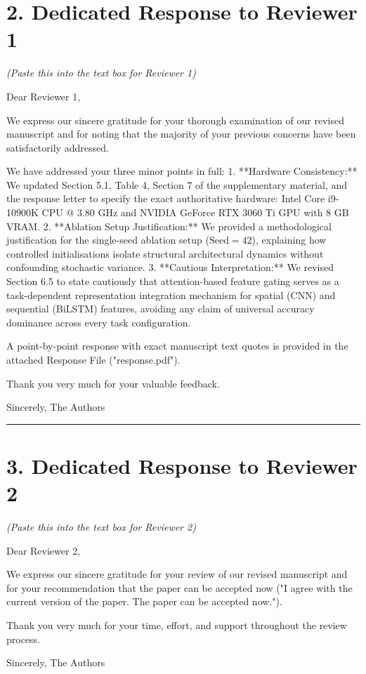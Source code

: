 \documentclass[11pt]{article}
\begin{document}
\section*{2. Dedicated Response to Reviewer 1}
\textit{(Paste this into the text box for Reviewer 1)}

\begin{tcolorbox}[colback=boxbg,colframe=primaryblue,title=\textbf{Text for Reviewer 1 Box}]
Dear Reviewer 1,

We express our sincere gratitude for your thorough examination of our revised manuscript and for noting that the majority of your previous concerns have been satisfactorily addressed.

We have addressed your three minor points in full:
1. **Hardware Consistency:** We updated Section 5.1, Table 4, Section 7 of the supplementary material, and the response letter to specify the exact authoritative hardware: Intel Core i9-10900K CPU @ 3.80 GHz and NVIDIA GeForce RTX 3060 Ti GPU with 8 GB VRAM.
2. **Ablation Setup Justification:** We provided a methodological justification for the single-seed ablation setup ($\text{Seed} = 42$), explaining how controlled initialisations isolate structural architectural dynamics without confounding stochastic variance.
3. **Cautious Interpretation:** We revised Section 6.5 to state cautiously that attention-based feature gating serves as a task-dependent representation integration mechanism for spatial (CNN) and sequential (BiLSTM) features, avoiding any claim of universal accuracy dominance across every task configuration.

A point-by-point response with exact manuscript text quotes is provided in the attached Response File ("response.pdf").

Thank you very much for your valuable feedback.

Sincerely,  
The Authors
\end{tcolorbox}

\vspace{1.5em}
\hrule
\vspace{1.5em}

\section*{3. Dedicated Response to Reviewer 2}
\textit{(Paste this into the text box for Reviewer 2)}

\begin{tcolorbox}[colback=boxbg,colframe=primaryblue,title=\textbf{Text for Reviewer 2 Box}]
Dear Reviewer 2,

We express our sincere gratitude for your review of our revised manuscript and for your recommendation that the paper can be accepted now ("I agree with the current version of the paper. The paper can be accepted now.").

Thank you very much for your time, effort, and support throughout the review process.

Sincerely,  
The Authors
\end{tcolorbox}
\end{document}
